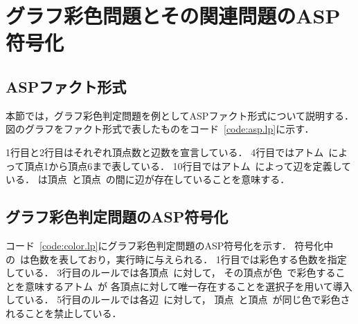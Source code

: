 \chapter{グラフ彩色問題とその関連問題のASP符号化}

\section{ASPファクト形式}



本節では，グラフ彩色判定問題を例としてASPファクト形式について説明する．
図のグラフをファクト形式で表したものをコード~\ref{code:asp.lp}に示す．

1行目と2行目はそれぞれ頂点数と辺数を宣言している．
4行目ではアトム~によって頂点1から頂点6まで表している．
10行目ではアトム~によって辺を定義している．
は頂点~と頂点~の間に辺が存在していることを意味する．

\section{グラフ彩色判定問題のASP符号化}



コード~\ref{code:color.lp}にグラフ彩色判定問題のASP符号化を示す．
符号化中の~は色数を表しており，実行時に与えられる．
1行目では彩色する色数を指定している．
3行目のルールでは各頂点~に対して，
その頂点が色~で彩色することを意味するアトム~が
各頂点に対して唯一存在することを選択子を用いて導入している．
5行目のルールでは各辺~に対して，
頂点~と頂点~が同じ色で彩色されることを禁止している．


